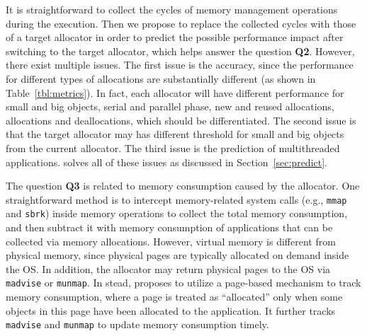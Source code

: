 
It is straightforward to collect the cycles of memory management operations during the execution. Then we propose to replace the collected cycles with those of a target allocator in order to predict the possible performance impact after switching to the target allocator, which helps answer the question \textbf{Q2}. However, there exist multiple issues. The first issue is the accuracy, since the performance for different types of allocations are substantially different (as shown in Table~\ref{tbl:metrics}). In fact, each allocator will have different performance for small and big objects, serial and parallel phase, new and reused allocations, allocations and deallocations, which should be differentiated. The second issue is that the target allocator may has different threshold for small and big objects from the current allocator. The third issue is the prediction of multithreaded applications. \MP{} solves all of these issues as discussed in Section~\ref{sec:predict}.

The question \textbf{Q3} is related to memory consumption caused by the allocator. One straightforward method is to intercept memory-related system calls (e.g., \texttt{mmap} and \texttt{sbrk}) inside memory operations to collect the total memory consumption, and then subtract it with memory consumption of applications that can be collected via memory allocations. However, virtual memory is different from physical memory, since physical pages are typically allocated on demand inside the OS. In addition, the allocator may return physical pages to the OS via \texttt{madvise} or \texttt{munmap}. In stead, \MP{} proposes to utilize a page-based mechanism to track memory consumption, where a page is treated as ``allocated'' only when some objects in this page have been allocated to the application. It further tracks \texttt{madvise} and \texttt{munmap} to update memory consumption timely. 

